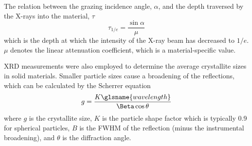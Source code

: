 \documentclass[draft,webedition,openright,titles,swedish,english]{LuaUUThesis}\usepackage[]{graphicx}\usepackage[]{xcolor}
\begin{document}
The relation between the grazing incidence angle, $\alpha$, and the depth
traversed by the X-rays into the material, $\tau$
\begin{equation}\label{eq:xrd-gi}
\tau_{1/e} = \frac{\sin\alpha}{\mu}
\end{equation}
which is the depth at which the intensity of the X-ray beam has decreased
to $1/e$. $\mu$ denotes the linear attenuation coefficient, which is a
material-specific value.

\Gls{XRD} measurements were also employed to determine the average crystallite sizes
in solid materials.
Smaller particle sizes cause a broadening of the reflections, which can be
calculated by the Scherrer equation \cite{Holzwarth2011}
\begin{equation}\label{eq:xrd-scherrer}
g = \frac{K\glsname{wavelength}}{\Beta\cos\theta}
\end{equation}
where $g$ is the crystallite size, $K$ is  the particle shape factor which is
typically \num{0.9} for spherical particles, $B$ is the \gls{FWHM} of the reflection
(minus the instrumental broadening), and $\theta$ is the diffraction angle.

%
\end{document}

